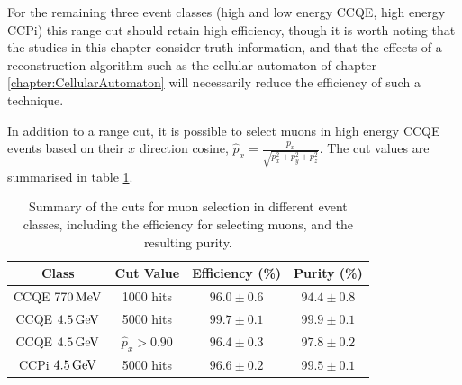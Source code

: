 For the remaining three event classes (high and low energy \acs{CCQE}, high energy \acs{CCPi}) this range cut should retain high efficiency, though it is worth noting that the studies in this chapter consider truth information, and that the effects of a reconstruction algorithm such as the cellular automaton of chapter \ref{chapter:CellularAutomaton} will necessarily reduce the efficiency of such a technique.

In addition to a range cut, it is possible to select muons in high energy \acs{CCQE} events based on their $x$ direction cosine, $\displaystyle \hat{p}_x = \frac{p_x}{\sqrt{p_x^2 + p_y^2 + p_z^2}}$. The cut values are summarised in table \ref{table:summary_cuts}.

\begin{table}
\centering
\begin{tabular}{cccc}
    Class & Cut Value & Efficiency (\%) & Purity (\%) \\
\hline
\hline
\acs{CCQE} $770\,\mathrm{MeV}$ & 1000 hits & $96.0\pm0.6$ & $94.4\pm0.8$ \\
\acs{CCQE} $4.5\,\mathrm{GeV}$ & 5000 hits & $99.7\pm0.1$ & $99.9\pm0.1$ \\
\acs{CCQE} $4.5\,\mathrm{GeV}$ & $\hat{p}_x > 0.90$ & $96.4\pm0.3$ & $97.8\pm0.2$ \\
\acs{CCPi} $4.5\,\mathrm{GeV}$ & 5000 hits & $96.6\pm0.2$ & $99.5\pm0.1$ \\
\hline 
\end{tabular}
\caption[Summary of cuts with efficiencies and purities]{\label{table:summary_cuts}Summary of the cuts for muon selection in different event classes, including the efficiency for selecting muons, and the resulting purity.}
\end{table}

